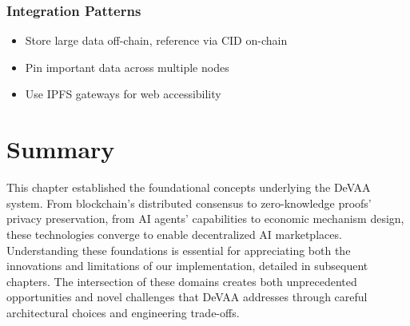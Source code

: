 \subsubsection{Integration Patterns}
\begin{itemize}
    \item Store large data off-chain, reference via CID on-chain
    \item Pin important data across multiple nodes
    \item Use IPFS gateways for web accessibility
\end{itemize}

\section{Summary}

This chapter established the foundational concepts underlying the DeVAA system. From blockchain's distributed consensus to zero-knowledge proofs' privacy preservation, from AI agents' capabilities to economic mechanism design, these technologies converge to enable decentralized AI marketplaces. Understanding these foundations is essential for appreciating both the innovations and limitations of our implementation, detailed in subsequent chapters. The intersection of these domains creates both unprecedented opportunities and novel challenges that DeVAA addresses through careful architectural choices and engineering trade-offs.

